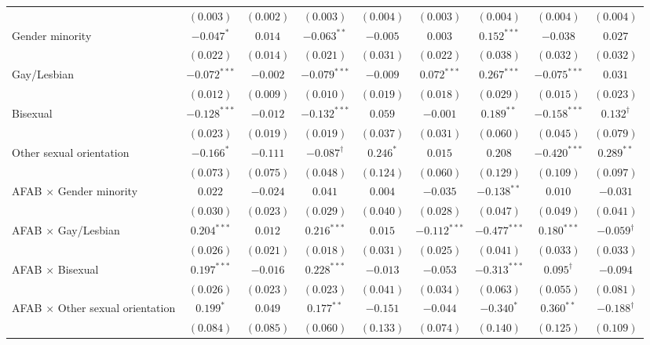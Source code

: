 \begin{table}[htpb]
{\begin{tabular}{l c c c c c c c c}
 & $(0.003)$ & $(0.002)$ & $(0.003)$ & $(0.004)$ & $(0.003)$ & $(0.004)$ & $(0.004)$ & $(0.004)$ \\
Gender minority & $-0.047^{*}$ & $0.014$ & $-0.063^{**}$ & $-0.005$ & $0.003$ & $0.152^{***}$ & $-0.038$ & $0.027$ \\
 & $(0.022)$ & $(0.014)$ & $(0.021)$ & $(0.031)$ & $(0.022)$ & $(0.038)$ & $(0.032)$ & $(0.032)$ \\
Gay/Lesbian & $-0.072^{***}$ & $-0.002$ & $-0.079^{***}$ & $-0.009$ & $0.072^{***}$ & $0.267^{***}$ & $-0.075^{***}$ & $0.031$ \\
 & $(0.012)$ & $(0.009)$ & $(0.010)$ & $(0.019)$ & $(0.018)$ & $(0.029)$ & $(0.015)$ & $(0.023)$ \\
Bisexual & $-0.128^{***}$ & $-0.012$ & $-0.132^{***}$ & $0.059$ & $-0.001$ & $0.189^{**}$ & $-0.158^{***}$ & $0.132^{\dagger}$ \\
 & $(0.023)$ & $(0.019)$ & $(0.019)$ & $(0.037)$ & $(0.031)$ & $(0.060)$ & $(0.045)$ & $(0.079)$ \\
Other sexual orientation & $-0.166^{*}$ & $-0.111$ & $-0.087^{\dagger}$ & $0.246^{*}$ & $0.015$ & $0.208$ & $-0.420^{***}$ & $0.289^{**}$ \\
 & $(0.073)$ & $(0.075)$ & $(0.048)$ & $(0.124)$ & $(0.060)$ & $(0.129)$ & $(0.109)$ & $(0.097)$ \\
AFAB $\times$ Gender minority & $0.022$ & $-0.024$ & $0.041$ & $0.004$ & $-0.035$ & $-0.138^{**}$ & $0.010$ & $-0.031$ \\
 & $(0.030)$ & $(0.023)$ & $(0.029)$ & $(0.040)$ & $(0.028)$ & $(0.047)$ & $(0.049)$ & $(0.041)$ \\
AFAB $\times$ Gay/Lesbian & $0.204^{***}$ & $0.012$ & $0.216^{***}$ & $0.015$ & $-0.112^{***}$ & $-0.477^{***}$ & $0.180^{***}$ & $-0.059^{\dagger}$ \\
 & $(0.026)$ & $(0.021)$ & $(0.018)$ & $(0.031)$ & $(0.025)$ & $(0.041)$ & $(0.033)$ & $(0.033)$ \\
AFAB $\times$ Bisexual & $0.197^{***}$ & $-0.016$ & $0.228^{***}$ & $-0.013$ & $-0.053$ & $-0.313^{***}$ & $0.095^{\dagger}$ & $-0.094$ \\
 & $(0.026)$ & $(0.023)$ & $(0.023)$ & $(0.041)$ & $(0.034)$ & $(0.063)$ & $(0.055)$ & $(0.081)$ \\
AFAB $\times$ Other sexual orientation & $0.199^{*}$ & $0.049$ & $0.177^{**}$ & $-0.151$ & $-0.044$ & $-0.340^{*}$ & $0.360^{**}$ & $-0.188^{\dagger}$ \\
 & $(0.084)$ & $(0.085)$ & $(0.060)$ & $(0.133)$ & $(0.074)$ & $(0.140)$ & $(0.125)$ & $(0.109)$ \\

\end{tabular}}
\end{table}
